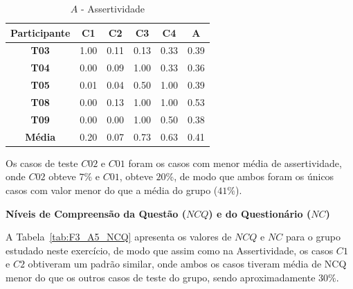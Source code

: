 \begin{table}[htbp]
	\centering
	\caption{$A$ - Assertividade}
	\begin{tabular}{|c|c|c|c|c|c|}
		\hline
		\rowcolor[HTML]{D9D9D9} 
		\textbf{Participante} & \textbf{C1} & \textbf{C2} & \textbf{C3} & \textbf{C4} & \textbf{A} \\ \hline
		\rowcolor[HTML]{FFFFFF} 
		\textbf{T03} & 1.00 & 0.11 & 0.13 & 0.33 & 0.39 \\ \hline
		\rowcolor[HTML]{E7E6E6} 
		\textbf{T04} & 0.00 & 0.09 & 1.00 & 0.33 & 0.36 \\ \hline
		\rowcolor[HTML]{FFFFFF} 
		\textbf{T05} & 0.01 & 0.04 & 0.50 & 1.00 & 0.39 \\ \hline
		\rowcolor[HTML]{E7E6E6} 
		\textbf{T08} & 0.00 & 0.13 & 1.00 & 1.00 & 0.53 \\ \hline
		\rowcolor[HTML]{FFFFFF} 
		\textbf{T09} & 0.00 & 0.00 & 1.00 & 0.50 & 0.38 \\ \hline
		\rowcolor[HTML]{D0CECE} 
		\textbf{Média} & 0.20 & 0.07 & 0.73 & 0.63 & 0.41 \\ \hline
	\end{tabular}
	\label{tab:F3_A5_A}
\end{table}

Os casos de teste $C02$ e $C01$ foram os casos com menor média de assertividade, onde $C02$ obteve $7\%$ e $C01$, obteve $20\%$, de modo que ambos foram os únicos casos com valor menor do que a média do grupo ($41\%$).



\textbf{Níveis de Compreensão da Questão ($NCQ$) e do Questionário ($NC$)}

A Tabela~\ref{tab:F3_A5_NCQ} apresenta os valores de $NCQ$ e $NC$ para o grupo estudado neste exercício, de modo que assim como na Assertividade, os casos $C1$ e $C2$ obtiveram um padrão similar, onde ambos os casos tiveram média de NCQ menor do que os outros casos de teste do grupo, sendo aproximadamente $30\%$.

